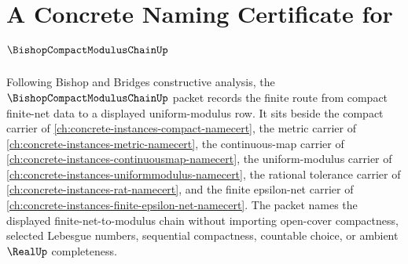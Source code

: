 \chapter{A Concrete Naming Certificate for $\BishopCompactModulusChainUp$}
\label{ch:concrete-instances-bishop-compact-modulus-chain-namecert}

Following Bishop and Bridges constructive analysis, the $\BishopCompactModulusChainUp$ packet records the finite route from compact finite-net data to a displayed uniform-modulus row. It sits beside the compact carrier of \autoref{ch:concrete-instances-compact-namecert}, the metric carrier of \autoref{ch:concrete-instances-metric-namecert}, the continuous-map carrier of \autoref{ch:concrete-instances-continuousmap-namecert}, the uniform-modulus carrier of \autoref{ch:concrete-instances-uniformmodulus-namecert}, the rational tolerance carrier of \autoref{ch:concrete-instances-rat-namecert}, and the finite epsilon-net carrier of \autoref{ch:concrete-instances-finite-epsilon-net-namecert}. The packet names the displayed finite-net-to-modulus chain without importing open-cover compactness, selected Lebesgue numbers, sequential compactness, countable choice, or ambient $\RealUp$ completeness.

